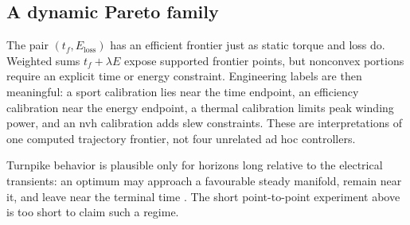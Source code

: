\subsection{A dynamic Pareto family}

The pair \((t_f,E_{\mathrm{loss}})\) has an efficient frontier just as static
torque and loss do.  Weighted sums \(t_f+\lambda E\) expose supported frontier
points, but nonconvex portions require an explicit time or energy constraint.
Engineering labels are then meaningful: a sport calibration lies near the
time endpoint, an efficiency calibration near the energy endpoint, a thermal
calibration limits peak winding power, and an \gls{nvh} calibration adds slew
constraints.  These are interpretations of one computed trajectory frontier,
not four unrelated ad hoc controllers.

Turnpike behavior is plausible only for horizons long relative to the
electrical transients: an optimum may approach a favourable steady manifold,
remain near it, and leave near the terminal time \parencite{trelat2015}.  The
short point-to-point experiment above is too short to claim such a regime.
